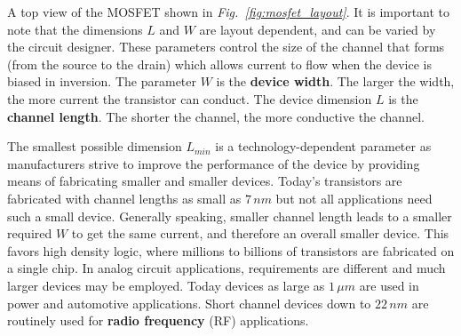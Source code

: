 A top view of the MOSFET shown in \emph{Fig.~\ref{fig:mosfet_layout}}.  It is important to note that the dimensions $L$ and $W$ are layout dependent, and can be varied by the circuit designer.  These parameters control the size of the channel that forms (from the source to the drain) which allows current to flow when the device is biased in inversion.  The parameter $W$ is the \textbf{device width}.  The larger the width, the more current the transistor can conduct.  The device dimension $L$ is the \textbf{channel length}. The shorter the channel, the more conductive the channel.

The smallest possible dimension $L_{min}$ is a technology-dependent parameter as manufacturers strive to improve the performance of the device by providing means of fabricating smaller and smaller devices.  Today's transistors are fabricated with channel lengths as small as $7\,nm$ but not all applications need such a small device.  Generally speaking, smaller channel length leads to a smaller required $W$ to get the same current, and therefore an overall smaller device.  This favors high density logic, where millions to billions of transistors are fabricated on a single chip.  In analog circuit applications, requirements are different and much larger devices may be employed.  Today devices as large as $1\,\mu m$ are used in power and automotive applications.  Short channel devices down to $22\,nm$ are routinely used for \textbf{radio frequency} (RF) applications.

